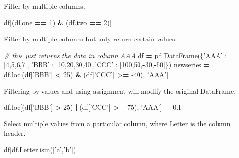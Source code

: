 \documentclass[]{book}
\newenvironment{Shaded}{\begin{snugshade}}{\end{snugshade}}
\newcommand{\CommentTok}[1]{\textcolor[rgb]{0.56,0.35,0.01}{\textit{#1}}}
\newcommand{\DecValTok}[1]{\textcolor[rgb]{0.00,0.00,0.81}{#1}}
\newcommand{\FloatTok}[1]{\textcolor[rgb]{0.00,0.00,0.81}{#1}}
\newcommand{\NormalTok}[1]{#1}
\newcommand{\OperatorTok}[1]{\textcolor[rgb]{0.81,0.36,0.00}{\textbf{#1}}}
\newcommand{\StringTok}[1]{\textcolor[rgb]{0.31,0.60,0.02}{#1}}
\begin{document}
Filter by multiple columns.

\begin{Shaded}
\begin{Highlighting}[]
\NormalTok{df[(df.one }\OperatorTok{==} \DecValTok{1}\NormalTok{) }\OperatorTok{&}\NormalTok{ (df.two }\OperatorTok{==} \DecValTok{2}\NormalTok{)]}
\end{Highlighting}
\end{Shaded}

Filter by multiple columns but only return certain values.

\begin{Shaded}
\begin{Highlighting}[]
\CommentTok{# this just returns the data in column AAA}
\NormalTok{df }\OperatorTok{=}\NormalTok{ pd.DataFrame(\{}\StringTok{'AAA'}\NormalTok{ : [}\DecValTok{4}\NormalTok{,}\DecValTok{5}\NormalTok{,}\DecValTok{6}\NormalTok{,}\DecValTok{7}\NormalTok{], }\StringTok{'BBB'}\NormalTok{ : [}\DecValTok{10}\NormalTok{,}\DecValTok{20}\NormalTok{,}\DecValTok{30}\NormalTok{,}\DecValTok{40}\NormalTok{],}\StringTok{'CCC'}\NormalTok{ : [}\DecValTok{100}\NormalTok{,}\DecValTok{50}\NormalTok{,}\OperatorTok{-}\DecValTok{30}\NormalTok{,}\OperatorTok{-}\DecValTok{50}\NormalTok{]\})}
\NormalTok{newseries }\OperatorTok{=}\NormalTok{ df.loc[(df[}\StringTok{'BBB'}\NormalTok{] }\OperatorTok{<} \DecValTok{25}\NormalTok{) }\OperatorTok{&}\NormalTok{ (df[}\StringTok{'CCC'}\NormalTok{] }\OperatorTok{>=} \DecValTok{-40}\NormalTok{), }\StringTok{'AAA'}\NormalTok{]}
\end{Highlighting}
\end{Shaded}

Filtering by values and using assignment will modify the original DataFrame.

\begin{Shaded}
\begin{Highlighting}[]
\NormalTok{df.loc[(df[}\StringTok{'BBB'}\NormalTok{] }\OperatorTok{>} \DecValTok{25}\NormalTok{) }\OperatorTok{|}\NormalTok{ (df[}\StringTok{'CCC'}\NormalTok{] }\OperatorTok{>=} \DecValTok{75}\NormalTok{), }\StringTok{'AAA'}\NormalTok{] }\OperatorTok{=} \FloatTok{0.1}
\end{Highlighting}
\end{Shaded}

Select multiple values from a particular column, where Letter is the column header.

\begin{Shaded}
\begin{Highlighting}[]
\NormalTok{df[df.Letter.isin([}\StringTok{'a'}\NormalTok{,}\StringTok{'b'}\NormalTok{])]}
\end{Highlighting}
\end{Shaded}
\end{document}
